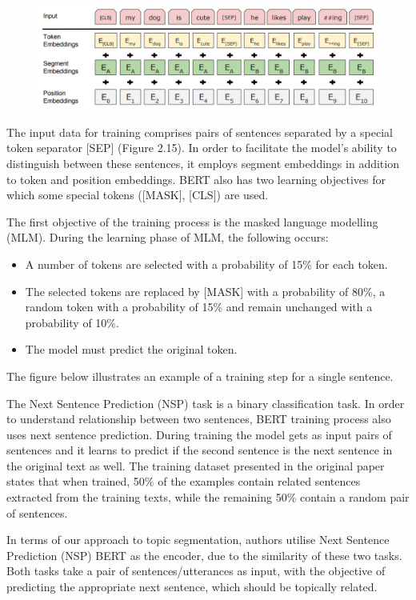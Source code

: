 \documentclass[PMI,VKR]{HSEUniversity}
\begin{document}
\begin{figure}[h]
    \centering
    \includegraphics[scale=0.6]{img/bert_input.png}
    \caption{}
\end{figure}

The input data for training comprises pairs of sentences separated by a special token separator [SEP] (Figure 2.15). 
In order to facilitate the model's ability to distinguish between these sentences, it employs segment embeddings in addition to token and position embeddings. 
BERT also has two learning objectives for which some special tokens ([MASK], [CLS]) are used. 

The first objective of the training process is the masked language modelling (MLM). 
During the learning phase of MLM, the following occurs:

\begin{itemize}
    \item A number of tokens are selected with a probability of 15\% for each token.
    \item The selected tokens are replaced by [MASK] with a probability of 80\%, a random token with a probability of 15\% and remain unchanged with a probability of 10\%.
    \item The model must predict the original token.
\end{itemize}

The figure below illustrates an example of a training step for a single sentence.

The Next Sentence Prediction (NSP) task is a binary classification task. 
In order to understand relationship between two sentences, BERT training process also uses next sentence prediction.
During training the model gets as input pairs of sentences and it learns to predict if the second sentence is the next sentence in the original text as well. 
The training dataset presented in the original paper states that when trained, 50\% of the examples contain related sentences extracted from the training texts, while the remaining 50\% contain a random pair of sentences.

In terms of our approach to topic segmentation, authors utilise Next Sentence Prediction (NSP) BERT as the encoder, due to the similarity of these two tasks. 
Both tasks take a pair of sentences/utterances as input, with the objective of predicting the appropriate next sentence, which should be topically related. 
\end{document}
